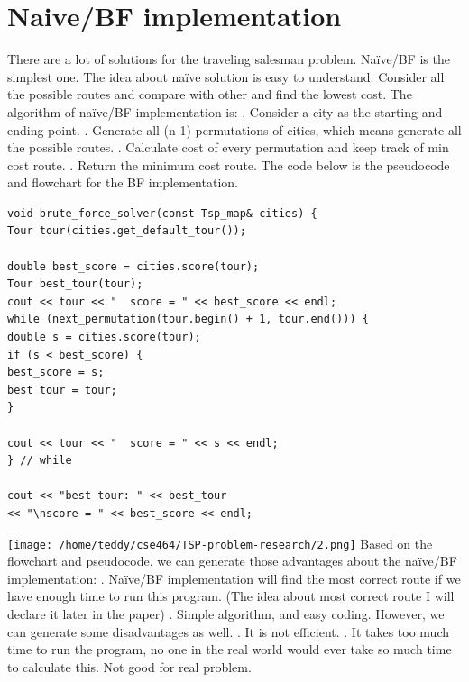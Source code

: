 \documentclass[a4paper,man,natbib]{apa6}
\begin{document}
\section{Naive/BF implementation}
There are a lot of solutions for the traveling salesman problem. Naïve/BF is the simplest one. The idea about naïve solution is easy to understand. Consider all the possible routes and compare with other and find the lowest cost. The algorithm of naïve/BF implementation is:
. Consider a city as the starting and ending point.
. Generate all (n-1) permutations of cities, which means generate all the possible routes.
. Calculate cost of every permutation and keep track of min cost route.
. Return the minimum cost route. 
\newline 
The code below is the pseudocode and flowchart for the BF implementation.
\begin{lstlisting}
void brute_force_solver(const Tsp_map& cities) {
Tour tour(cities.get_default_tour());

double best_score = cities.score(tour);
Tour best_tour(tour);
cout << tour << "  score = " << best_score << endl;
while (next_permutation(tour.begin() + 1, tour.end())) {
double s = cities.score(tour);
if (s < best_score) {
best_score = s;
best_tour = tour;
}

cout << tour << "  score = " << s << endl;
} // while
 
cout << "best tour: " << best_tour
<< "\nscore = " << best_score << endl;
\end{lstlisting}
\texttt{[image: /home/teddy/cse464/TSP-problem-research/2.png]}
Based on the flowchart and pseudocode, we can generate those advantages about the naïve/BF implementation:
. Naïve/BF implementation will find the most correct route if we have enough time to run this program. (The idea about most correct route I will declare it later in the paper)
. Simple algorithm, and easy coding.
\newline 
However, we can generate some disadvantages as well.
. It is not efficient. 
. It takes too much time to run the program, no one in the real world would ever take so much time to calculate this. Not good for real problem.
\end{document}
